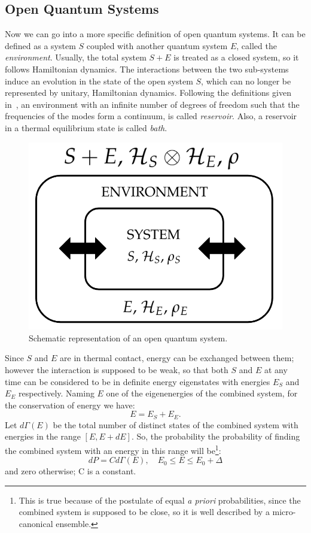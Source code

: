 \subsection{Open Quantum Systems}
Now we can go into a more specific definition of open quantum systems. It can be defined as a system $S$ coupled with another quantum system $E$, called the \emph{environment}. Usually, the total system $S+E$ is treated as a closed system, so it follows Hamiltonian dynamics. The interactions between the two sub-systems induce an evolution in the state of the open system $S$, which can no longer be represented by unitary, Hamiltonian dynamics. Following the definitions given in~\cite{pet_breuer:open_quantum}, an environment with an infinite number of degrees of freedom such that the frequencies of the modes form a continuum, is called \emph{reservoir}. Also, a reservoir in a thermal equilibrium state is called \emph{bath}.

\begin{figure}
    \centering
    \includegraphics[scale=0.5]{Figures/openSystems_sketch.png}
    \caption{Schematic representation of an open quantum system.}
    \label{fig:openSystems_sketch}
\end{figure}

Since $S$ and $E$ are in thermal contact, energy can be exchanged between them; however the interaction is supposed to be weak, so that both $S$ and $E$ at any time can be considered to be in definite energy eigenstates with energies $E_S$ and $E_E$ respectively. Naming $E$ one of the eigenenergies of the combined system, for the conservation of energy we have:
\begin{equation*}
    E = E_S + E_E.
\end{equation*}
Let $d\Gamma(E)$ be the total number of distinct states of the combined system with energies in the range $[E, E+dE]$. So, the probability the probability of finding the combined system with an energy in this range will be\footnote{This is true because of the postulate of equal \emph{a priori} probabilities, since the combined system is supposed to be close, so it is well described by a micro-canonical ensemble.}:
\begin{equation}
    dP = C d\Gamma(E), \quad E_0 \leq E \leq E_0 + \Delta
\end{equation}
and zero otherwise; C is a constant.

